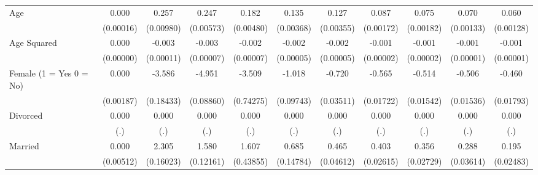 {\begin{tabular}{l*{10}{c}}
Age                 &       0.000         &       0.257\sym{***}&       0.247\sym{***}&       0.182\sym{***}&       0.135\sym{***}&       0.127\sym{***}&       0.087\sym{***}&       0.075\sym{***}&       0.070\sym{***}&       0.060\sym{***}\\
                    &   (0.00016)         &   (0.00980)         &   (0.00573)         &   (0.00480)         &   (0.00368)         &   (0.00355)         &   (0.00172)         &   (0.00182)         &   (0.00133)         &   (0.00128)         \\
Age Squared         &       0.000         &      -0.003\sym{***}&      -0.003\sym{***}&      -0.002\sym{***}&      -0.002\sym{***}&      -0.002\sym{***}&      -0.001\sym{***}&      -0.001\sym{***}&      -0.001\sym{***}&      -0.001\sym{***}\\
                    &   (0.00000)         &   (0.00011)         &   (0.00007)         &   (0.00007)         &   (0.00005)         &   (0.00005)         &   (0.00002)         &   (0.00002)         &   (0.00001)         &   (0.00001)         \\
Female (1 = Yes 0 = No)&       0.000         &      -3.586\sym{***}&      -4.951\sym{***}&      -3.509\sym{***}&      -1.018\sym{***}&      -0.720\sym{***}&      -0.565\sym{***}&      -0.514\sym{***}&      -0.506\sym{***}&      -0.460\sym{***}\\
                    &   (0.00187)         &   (0.18433)         &   (0.08860)         &   (0.74275)         &   (0.09743)         &   (0.03511)         &   (0.01722)         &   (0.01542)         &   (0.01536)         &   (0.01793)         \\
Divorced            &       0.000         &       0.000         &       0.000         &       0.000         &       0.000         &       0.000         &       0.000         &       0.000         &       0.000         &       0.000         \\
                    &         (.)         &         (.)         &         (.)         &         (.)         &         (.)         &         (.)         &         (.)         &         (.)         &         (.)         &         (.)         \\
Married             &       0.000         &       2.305\sym{***}&       1.580\sym{***}&       1.607\sym{***}&       0.685\sym{***}&       0.465\sym{***}&       0.403\sym{***}&       0.356\sym{***}&       0.288\sym{***}&       0.195\sym{***}\\
                    &   (0.00512)         &   (0.16023)         &   (0.12161)         &   (0.43855)         &   (0.14784)         &   (0.04612)         &   (0.02615)         &   (0.02729)         &   (0.03614)         &   (0.02483)         \\

\end{tabular}}
